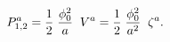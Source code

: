 \begin{equation}
P^a_{1,2}  = {1\over2}\; {\phi_0^2\over a} \;\; V^a 
=  {1\over2}\; {\phi_0^2\over a^2} \;\; \zeta^a.
\end{equation}

